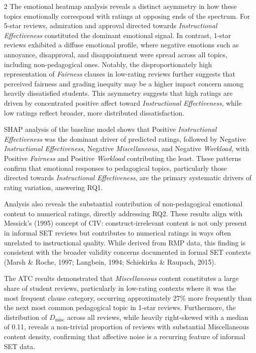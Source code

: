 \documentclass{article}
\begin{document}
\begin{multicols*}{2}
The emotional heatmap analysis reveals a distinct asymmetry in how these topics emotionally correspond with ratings at opposing ends of the spectrum. For 5-star reviews, admiration and approval directed towards \textit{Instructional Effectiveness} constituted the dominant emotional signal. In contrast, 1-star reviews exhibited a diffuse emotional profile, where negative emotions such as annoyance, disapproval, and disappointment were spread across all topics, including non-pedagogical ones. Notably, the disproportionately high representation of \textit{Fairness} clauses in low-rating reviews further suggests that perceived fairness and grading inequity may be a higher impact concern among heavily dissatisfied students. This asymmetry suggests that high ratings are driven by concentrated positive affect toward \textit{Instructional Effectiveness}, while low ratings reflect broader, more distributed dissatisfaction.

SHAP analysis of the baseline model shows that Positive \textit{Instructional Effectiveness} was the dominant driver of predicted ratings, followed by Negative \textit{Instructional Effectiveness}, Negative \textit{Miscellaneous}, and Negative \textit{Workload}, with Positive \textit{Fairness} and Positive \textit{Workload} contributing the least. These patterns confirm that emotional responses to pedagogical topics, particularly those directed towards \textit{Instructional Effectiveness}, are the primary systematic drivers of rating variation, answering RQ1.


Analysis also reveals the substantial contribution of non-pedagogical emotional content to numerical ratings, directly addressing RQ2. These results align with Messick’s (1995) concept of CIV: construct-irrelevant content is not only present in informal SET reviews but contributes to numerical ratings in ways often unrelated to instructional quality. While derived from RMP data, this finding is consistent with the broader validity concerns documented in formal SET contexts (Marsh \& Roche, 1997; Langbein, 1994; Schiekirka \& Raupach, 2015). 

The ATC results demonstrated that \textit{Miscellaneous} content constitutes a large share of student reviews, particularly in low-rating contexts where it was the most frequent clause category, occurring approximately 27\% more frequently than the next most common pedagogical topic in 1-star reviews. Furthermore, the distribution of $D_\text{misc}$ across all reviews, while heavily right-skewed with a median of 0.11, reveals a non-trivial proportion of reviews with substantial Miscellaneous content density, confirming that affective noise is a recurring feature of informal SET data. 


\end{multicols*}
\end{document}

